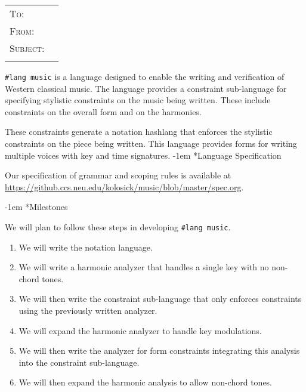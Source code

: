 \documentclass{article}
\makeatletter
\newcommand{\makeheader}{%
  \noindent
  \begin{tabular}{@{}ll}
    \ifdefined\@recipient
      \textsc{To: } & \@recipient{} \\
    \fi
    \ifdefined\@from
      \textsc{From: } & \@from{} \\
    \fi
    \ifdefined\@subject
      \textsc{Subject: } & \@subject{} \\
    \fi
  \end{tabular}
  \vspace{1\baselineskip}
}
\renewcommand\section{\@startsection {section}{1}{\z@}%
    {\z@}
    {-1em}%
    {\itshape}}
\newcommand{\music}{\texttt{\#lang music}}
\makeatother
\begin{document}
\makeheader{}

\music{} is a language designed to enable the writing and verification of Western
classical music. The language provides a constraint sub-language for specifying
stylistic constraints on the music being written. These include constraints on
the overall form and on the harmonies.

These constraints generate a notation hashlang that enforces the stylistic
constraints on the piece being written. This language provides forms for writing
multiple voices with key and time signatures. 
\section*{Language Specification}

Our specification of grammar and scoping rules is available at
\url{https://github.ccs.neu.edu/kolosick/music/blob/master/spec.org}.

\section*{Milestones}

We will plan to follow these steps in developing \music{}.
\begin{enumerate}
  \item We will write the notation language.
  \item We will write a harmonic analyzer that handles a single key with no
    non-chord tones.
  \item We will then write the constraint sub-language that only enforces
    constraints using the previously written analyzer.
  \item We will expand the harmonic analyzer to handle key modulations.
  \item We will then write the analyzer for form constraints integrating this
    analysis into the constraint sub-language.
  \item We will then expand the harmonic analysis to allow non-chord tones.
\end{enumerate}
\end{document}

